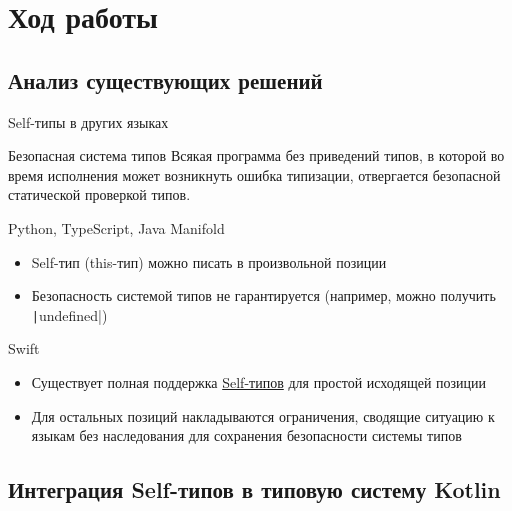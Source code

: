 \documentclass[handout,aspectratio=169,usenames,dvipsnames]{beamer}
\begin{document}
    \section{Ход работы}

    \subsection{Анализ существующих решений}

    \begin{frame}[fragile]{Self-типы в других языках}
        \begin{block}{Безопасная система типов}
            Всякая программа без приведений типов, в которой во время исполнения может возникнуть ошибка типизации, отвергается безопасной статической проверкой типов.
        \end{block}
        \pause
        \begin{block}{Python, TypeScript, Java Manifold}
            \begin{itemize}
                \item Self-тип (this-тип) можно писать в произвольной позиции
                \item Безопасность системой типов не гарантируется (например, можно получить \texttt|undefined|)
            \end{itemize}
        \end{block}
        \pause
        \begin{block}{Swift}
            \begin{itemize}
                \item Существует полная поддержка \href{https://docs.swift.org/swift-book/documentation/the-swift-programming-language/types/\#Self-Type}{Self-типов} для простой исходящей позиции
                \item Для остальных позиций накладываются ограничения, сводящие ситуацию к языкам без наследования для сохранения безопасности системы типов
            \end{itemize}
        \end{block}
    \end{frame}

    \subsection{Интеграция Self-типов в типовую систему Kotlin}
\end{document}
